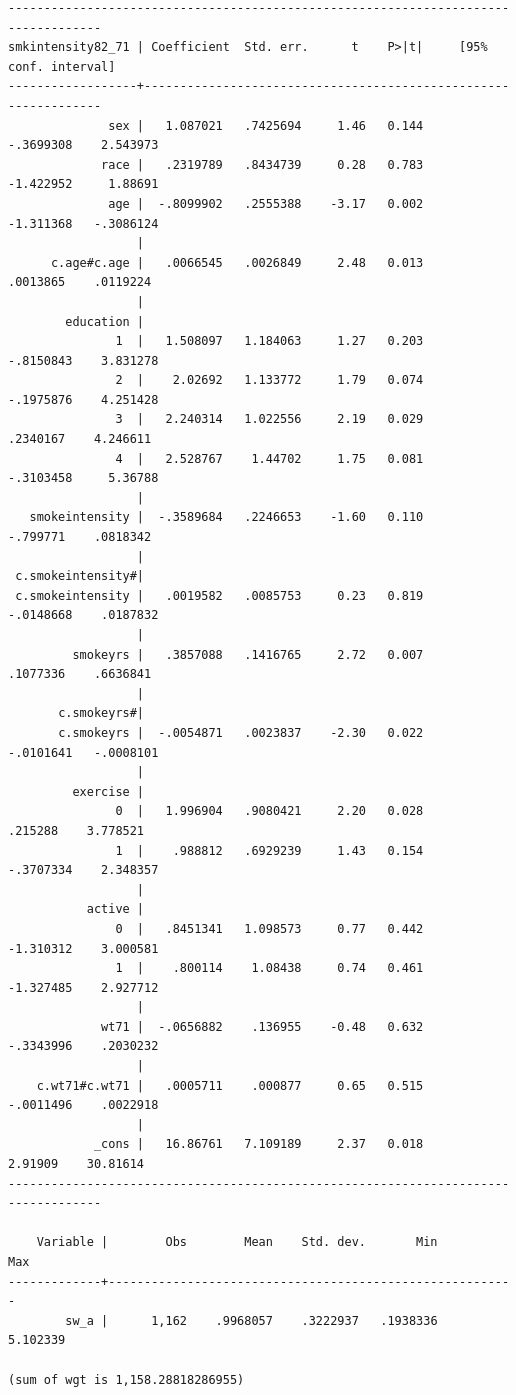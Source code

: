 \documentclass[
  10pt,
  a4paper,
]{book}
\begin{document}
\begin{verbatim}
-----------------------------------------------------------------------------------
smkintensity82_71 | Coefficient  Std. err.      t    P>|t|     [95% conf. interval]
------------------+----------------------------------------------------------------
              sex |   1.087021   .7425694     1.46   0.144    -.3699308    2.543973
             race |   .2319789   .8434739     0.28   0.783    -1.422952     1.88691
              age |  -.8099902   .2555388    -3.17   0.002    -1.311368   -.3086124
                  |
      c.age#c.age |   .0066545   .0026849     2.48   0.013     .0013865    .0119224
                  |
        education |
               1  |   1.508097   1.184063     1.27   0.203    -.8150843    3.831278
               2  |    2.02692   1.133772     1.79   0.074    -.1975876    4.251428
               3  |   2.240314   1.022556     2.19   0.029     .2340167    4.246611
               4  |   2.528767    1.44702     1.75   0.081    -.3103458     5.36788
                  |
   smokeintensity |  -.3589684   .2246653    -1.60   0.110     -.799771    .0818342
                  |
 c.smokeintensity#|
 c.smokeintensity |   .0019582   .0085753     0.23   0.819    -.0148668    .0187832
                  |
         smokeyrs |   .3857088   .1416765     2.72   0.007     .1077336    .6636841
                  |
       c.smokeyrs#|
       c.smokeyrs |  -.0054871   .0023837    -2.30   0.022    -.0101641   -.0008101
                  |
         exercise |
               0  |   1.996904   .9080421     2.20   0.028      .215288    3.778521
               1  |    .988812   .6929239     1.43   0.154    -.3707334    2.348357
                  |
           active |
               0  |   .8451341   1.098573     0.77   0.442    -1.310312    3.000581
               1  |    .800114    1.08438     0.74   0.461    -1.327485    2.927712
                  |
             wt71 |  -.0656882    .136955    -0.48   0.632    -.3343996    .2030232
                  |
    c.wt71#c.wt71 |   .0005711    .000877     0.65   0.515    -.0011496    .0022918
                  |
            _cons |   16.86761   7.109189     2.37   0.018      2.91909    30.81614
-----------------------------------------------------------------------------------

    Variable |        Obs        Mean    Std. dev.       Min        Max
-------------+---------------------------------------------------------
        sw_a |      1,162    .9968057    .3222937   .1938336   5.102339

(sum of wgt is 1,158.28818286955)


\end{verbatim}
\end{document}
